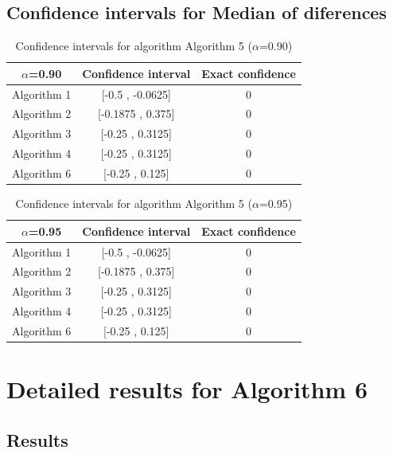 \documentclass[a4paper,10pt]{article}
\begin{document}
\subsection{Confidence intervals for Median of diferences}

\begin{table}[!htp]
\centering\small
\begin{tabular}{
|c|c|c|}
\hline
 $\alpha$=0.90 & Confidence interval & Exact confidence \\ \hline 
Algorithm 1 & [-0.5 , -0.0625] & 0\\ \hline 
Algorithm 2 & [-0.1875 , 0.375] & 0\\ \hline 
Algorithm 3 & [-0.25 , 0.3125] & 0\\ \hline 
Algorithm 4 & [-0.25 , 0.3125] & 0\\ \hline 
Algorithm 6 & [-0.25 , 0.125] & 0\\ \hline 

\end{tabular}
\caption{Confidence intervals for algorithm Algorithm 5 ($\alpha$=0.90)}
\end{table}
\begin{table}[!htp]
\centering\small
\begin{tabular}{
|c|c|c|}
\hline
 $\alpha$=0.95 & Confidence interval & Exact confidence \\ \hline 
Algorithm 1 & [-0.5 , -0.0625] & 0\\ \hline 
Algorithm 2 & [-0.1875 , 0.375] & 0\\ \hline 
Algorithm 3 & [-0.25 , 0.3125] & 0\\ \hline 
Algorithm 4 & [-0.25 , 0.3125] & 0\\ \hline 
Algorithm 6 & [-0.25 , 0.125] & 0\\ \hline 

\end{tabular}
\caption{Confidence intervals for algorithm Algorithm 5 ($\alpha$=0.95)}
\end{table}

 \clearpage 


\section{Detailed results for Algorithm 6}


\subsection{Results}
\end{document}
